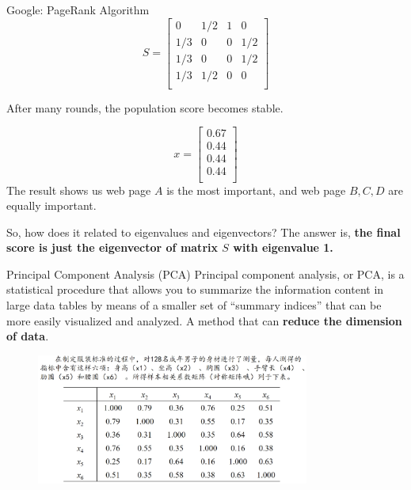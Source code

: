 \documentclass{beamer}
\begin{document}
\begin{frame}{Google: PageRank Algorithm}
\begin{equation*}
    S=\left[ \begin{matrix}
        0&		1/2&		1&		0\\
        1/3&		0&		0&		1/2\\
        1/3&		0&		0&		1/2\\
        1/3&		1/2&		0&		0\\
    \end{matrix} \right]
\end{equation*}

After many rounds, the population score becomes stable.

\begin{equation*}
    x=\left[ \begin{array}{c}
        0.67\\
        0.44\\
        0.44\\
        0.44\\
    \end{array} \right]
\end{equation*}
The result shows us web page $A$ is the most important, and web page $B,C,D$ are equally important.

\vspace{3pt}
So, how does it related to eigenvalues and eigenvectors? The answer is, \textbf{the final score is just the eigenvector of matrix $S$ with eigenvalue 1.}

\end{frame}

\begin{frame}{Principal Component Analysis (PCA)}
Principal component analysis, or PCA, is a statistical procedure that allows you to summarize the information content in large data tables by means of a smaller set of “summary indices” that can be more easily visualized and analyzed. A method that can \textbf{reduce the dimension of data}.
\begin{figure}
    \includegraphics[width=0.8\textwidth]{pca.png}
\end{figure}
\end{frame}
\end{document}
